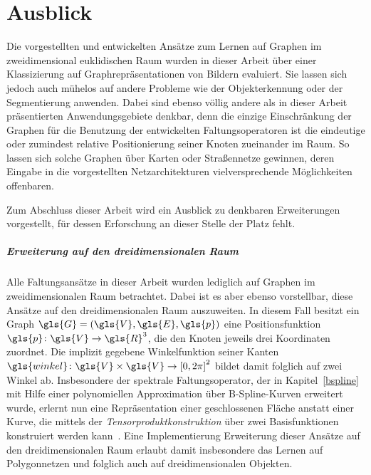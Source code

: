 \chapter{Ausblick}
\label{ausblick}

Die vorgestellten und entwickelten Ansätze zum Lernen auf Graphen im zweidimensional euklidischen Raum wurden in dieser Arbeit über einer Klassizierung auf Graphrepräsentationen von Bildern evaluiert.
Sie lassen sich jedoch auch mühelos auf andere Probleme wie \zB{} der Objekterkennung oder der Segmentierung anwenden.
Dabei sind ebenso völlig andere als in dieser Arbeit präsentierten Anwendungsgebiete denkbar, denn die einzige Einschränkung der Graphen für die Benutzung der entwickelten Faltungsoperatoren ist die eindeutige oder zumindest relative Positionierung seiner Knoten zueinander im Raum.
So lassen sich solche Graphen \bspw{} über Karten oder Straßennetze gewinnen, deren Eingabe in die vorgestellten Netzarchitekturen vielversprechende Möglichkeiten offenbaren.

Zum Abschluss dieser Arbeit wird ein Ausblick zu denkbaren Erweiterungen vorgestellt, für dessen Erforschung an dieser Stelle der Platz fehlt.

\paragraph{Erweiterung auf den dreidimensionalen Raum}
\label{dredimensionale_erweiterung}

Alle Faltungsansätze in dieser Arbeit wurden lediglich auf Graphen im zweidimensionalen Raum betrachtet.
Dabei ist es aber ebenso vorstellbar, diese Ansätze auf den dreidimensionalen Raum auszuweiten.
In diesem Fall besitzt ein Graph $\gls{G} = \left(\gls{V}, \gls{E}, \gls{p}\right)$ eine Positionsfunktion $\gls{p} \colon \gls{V} \to \gls{R}^3$, die den Knoten jeweils drei Koordinaten zuordnet.
Die implizit gegebene Winkelfunktion seiner Kanten $\gls{winkel} \colon \gls{V} \times \gls{V} \to {\left[0, 2\pi\right]}^2$ bildet damit folglich auf zwei Winkel ab.
Insbesondere der spektrale Faltungsoperator, der in Kapitel~\ref{bspline} mit Hilfe einer polynomiellen Approximation über B-Spline-Kurven erweitert wurde, erlernt nun eine Repräsentation einer geschlossenen Fläche anstatt einer Kurve, die mittels der \emph{Tensorproduktkonstruktion} über zwei Basisfunktionen konstruiert werden kann~\cite{gm}.
Eine Implementierung \bzw{} Erweiterung dieser Ansätze auf den dreidimensionalen Raum erlaubt damit insbesondere das Lernen auf Polygonnetzen und folglich auch auf dreidimensionalen Objekten.

